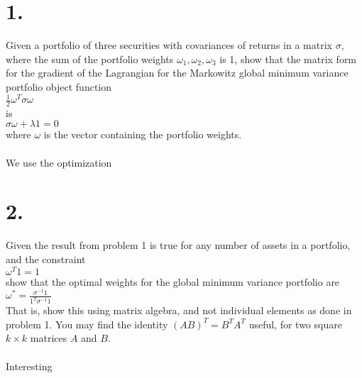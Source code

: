 \documentclass{article}
\begin{document}
\thispagestyle{firstpageheader}

\section*{1.}
{\Large 

Given a portfolio of three securities with covariances of returns in a matrix $\sigma$, where the sum of the portfolio weights $\omega_1, \omega_2, \omega_3$ is 1, show that the matrix form for the gradient of the Lagrangian for the Markowitz global minimum variance portfolio object function \\
$\frac{1}{2}\omega^T \sigma \omega$ \\
is \\
$\sigma\omega + \lambda1 = 0$ \\
where $\omega$ is the vector containing the portfolio weights. \\ \\ 

We use the optimization


}

\section*{2.}
{\Large

Given the result from problem 1 is true for any number of assets in a portfolio, and the constraint \\ 
$\omega^T1 = 1$ \\
show that the optimal weights for the global minimum variance portfolio are \\ 
$\omega^* = \frac{\sigma^{-1}1}{1^T\sigma^{-1}1}$ \\
That is, show this using matrix algebra, and not individual elements as done in problem 1. You may find the identity $(AB)^T = B^TA^T$ useful, for two square $k \times k$ matrices $A$ and $B$. \\ \\

Interesting


}
\end{document}
